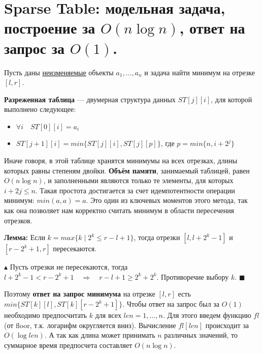 \setcounter{section}{58}
\section{Sparse Table: модельная задача, построение за $O(n \log n)$, ответ на запрос за $O(1)$. }
\noindent Пусть даны \underline{неизменяемые} объекты $a_1, \ldots, a_n$ и задача найти минимум на отрезке $[l,r]$.
\\ \par \noindent \textbf{Разреженная таблица} — двумерная структура данных $ST[j][i]$, для которой выполнено следующее:
\begin{itemize}
    \item $\forall i \quad ST[0][i] = a_i$
    \item $ST[j+1][i]= min\{ST[j][i], ST[j][p]\}$, \quad где $p=min\{n,i+2^j\}$
\end{itemize}
Иначе говоря, в этой таблице хранятся минимумы на всех отрезках, длины которых равны степеням двойки. \textbf{Объём памяти}, занимаемый таблицей, равен $O(n\log n)$, и заполненными являются только те элементы, для которых $i+2j\leq n$.
\newline Такая простота достигается за счет идемпотентности операции минимум: $min(a,a)=a$. Это один из ключевых моментов этого метода, так как она позволяет нам корректно считать минимум в области пересечения отрезков.
\\ \par \textbf{Лемма: } Если $k=max\{k\;|\;2^k\leq r-l+1\}$, тогда отрезки $[l,l+2^k-1]$ и $[r-2^k+1, r]$ пересекаются.
\par \noindent $\blacktriangle$ Пусть отрезки не пересекаются, тогда $l+2^k-1 < r-2^k+1 \quad \Rightarrow \quad r-l+1\geq 2^k + 2^k$. Противоречие выбору $k$. \quad $\blacksquare$
\\ \par \noindent Поэтому \textbf{ответ на запрос минимума} на отрезке $[l,r]$ есть $min\{ST[k][l], ST[k][r-2^k+1]\}$. Чтобы ответ на запрос был за $O(1)$ необходимо предпосчитать $k$ для всех $len = 1, \ldots, n$.
Для этого введем функцию $fl$ (от floor, т.к. логарифм округляется вниз). Вычисление $fl[len]$ происходит за $O(\log len)$. А так как длина может принимать $n$ различных значений, то суммарное время предпосчета составляет $O(n\log n)$.
